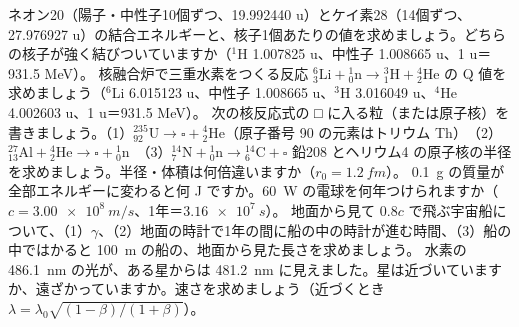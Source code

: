 \bkendproblems
{}
\bkproblem ネオン20（陽子・中性子10個ずつ、19.992440 u）とケイ素28（14個ずつ、27.976927 u）の結合エネルギーと、核子1個あたりの値を求めましょう。どちらの核子が強く結びついていますか（${}^1$H 1.007825 u、中性子 1.008665 u、1 u＝931.5 MeV）。
\bkproblem 核融合炉で三重水素をつくる反応 ${}^6_3\mathrm{Li}+{}^1_0\mathrm n\to{}^3_1\mathrm H+{}^4_2\mathrm{He}$ の Q 値を求めましょう（${}^6$Li 6.015123 u、中性子 1.008665 u、${}^3$H 3.016049 u、${}^4$He 4.002603 u、1 u＝931.5 MeV）。
\bkproblem 次の核反応式の □ に入る粒（または原子核）を書きましょう。（1）${}^{235}_{92}\mathrm U\to\square+{}^4_2\mathrm{He}$（原子番号 90 の元素はトリウム Th）　（2）${}^{27}_{13}\mathrm{Al}+{}^4_2\mathrm{He}\to\square+{}^1_0\mathrm n$　（3）${}^{14}_7\mathrm N+{}^1_0\mathrm n\to{}^{14}_6\mathrm C+\square$
\bkproblem 鉛208 とヘリウム4 の原子核の半径を求めましょう。半径・体積は何倍違いますか（$r_0=\qty{1.2}{fm}$）。
\bkproblem \qty{0.1}{g} の質量が全部エネルギーに変わると何 J ですか。\qty{60}{W} の電球を何年つけられますか（$c=\qty{3.00e8}{m/s}$、1年＝$\qty{3.16e7}{s}$）。
\bkproblem 地面から見て $0.8c$ で飛ぶ宇宙船について、（1）$\gamma$、（2）地面の時計で1年の間に船の中の時計が進む時間、（3）船の中ではかると \qty{100}{m} の船の、地面から見た長さを求めましょう。
\bkproblem 水素の \qty{486.1}{nm} の光が、ある星からは \qty{481.2}{nm} に見えました。星は近づいていますか、遠ざかっていますか。速さを求めましょう（近づくとき $\lambda=\lambda_0\sqrt{(1-\beta)/(1+\beta)}$）。
